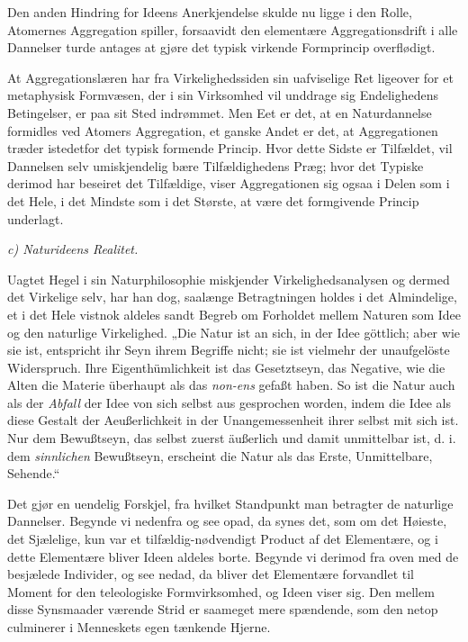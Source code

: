 \documentclass[12pt]{book}
\newcommand{\opage}[1]{\marginnote{\footnotesize\textit{[#1]}}}
\begin{document}
Den anden Hindring for Ideens Anerkjendelse skulde nu ligge i den Rolle, Atomernes Aggregation
spiller, forsaavidt den elementære Aggregationsdrift i alle Dannelser turde antages at gjøre det
typisk virkende Formprincip overflødigt.

At Aggregationslæren har fra Virkelighedssiden sin uafviselige Ret ligeover for et metaphysisk
Formvæsen, der i sin Virksomhed vil
unddrage sig Endelighedens Betingelser, er paa sit Sted indrømmet. Men Eet er det, at en Naturdannelse
formidles ved Atomers Aggregation, et ganske Andet er det, at Aggregationen træder istedetfor det
typisk formende Princip. Hvor dette Sidste er Tilfældet, vil Dannelsen selv umiskjendelig bære
Tilfældighedens Præg; hvor det Typiske derimod har beseiret det Tilfældige, viser Aggregationen sig
ogsaa i Delen som i det Hele, i det Mindste som i det Største, at være det formgivende Princip
underlagt.

\begin{center}\emph{c) Naturideens Realitet.}\end{center}

Uagtet Hegel i sin Naturphilosophie miskjender Virkelighedsanalysen og dermed det Virkelige selv, har
han dog, saalænge Betragtningen holdes i det Almindelige, et i det Hele vistnok aldeles sandt Begreb
om Forholdet mellem Naturen som Idee og den naturlige Virkelighed. „Die Natur ist an sich, in der Idee
göttlich; aber wie sie ist, entspricht ihr Seyn ihrem Begriffe nicht; sie ist vielmehr der
unaufgelöste Widerspruch. Ihre Eigenthümlichkeit ist das Gesetztseyn, das Negative, wie die Alten die
Materie überhaupt als das \textit{non-ens} gefaßt haben. So ist die Natur auch als der \emph{Abfall}
der Idee von sich selbst aus%
\opage{197}gesprochen worden, indem die Idee als diese Gestalt der Aeußerlichkeit in der Unangemessenheit ihrer
selbst mit sich ist. Nur dem Bewußtseyn, das selbst zuerst äußerlich und damit unmittelbar ist, d. i.
dem \emph{sinnlichen} Bewußtseyn, erscheint die Natur als das Erste, Unmittelbare, Sehende.“

Det gjør en uendelig Forskjel, fra hvilket Standpunkt man betragter de naturlige Dannelser. Begynde vi
nedenfra og see opad, da synes det, som om det Høieste, det Sjælelige, kun var et tilfældig-nødvendigt
Product af det Elementære, og i dette Elementære bliver Ideen aldeles borte. Begynde vi derimod fra
oven med de besjælede Individer, og see nedad, da bliver det Elementære forvandlet til Moment for den
teleologiske Formvirksomhed, og Ideen viser sig. Den mellem disse Synsmaader værende Strid er saameget
mere spændende, som den netop culminerer i Menneskets egen tænkende Hjerne.
\end{document}
